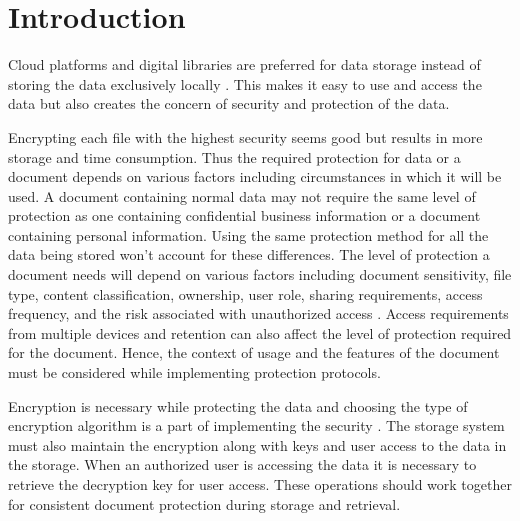 \documentclass[pdflatex,sn-mathphys-num]{sn-jnl}
\begin{document}

\maketitle

\section{Introduction}\label{sec1}

Cloud platforms and digital libraries are preferred for data storage instead of storing the data
exclusively locally \cite{asim2026adoption}. This makes it easy to use and access the data but
also creates the concern of security and protection of the data.

Encrypting each file with the highest security seems good but results in more storage and time
consumption. Thus the required protection for data or a document depends on various factors
including circumstances in which it will be used. A document containing normal data may not
require the same level of protection as one containing confidential business information or a
document containing personal information. Using the same protection method for all the data being
stored won't account for these differences. The level of protection a document needs will depend
on various factors including document sensitivity, file type, content classification, ownership,
user role, sharing requirements, access frequency, and the risk associated with unauthorized
access \cite{khan2023cybersecure,smallwood2012safeguarding,phoha2014context}. Access requirements
from multiple devices and retention can also affect the level of protection required for the
document. Hence, the context of usage and the features of the document must be considered while
implementing protection protocols.

Encryption is necessary while protecting the data and choosing the type of encryption algorithm
is a part of implementing the security \cite{akinkunmi2024importance}. The storage system must
also maintain the encryption along with keys and user access to the data in the storage. When an
authorized user is accessing the data it is necessary to retrieve the decryption key for user
access. These operations should work together for consistent document protection during storage
and retrieval.
\end{document}
